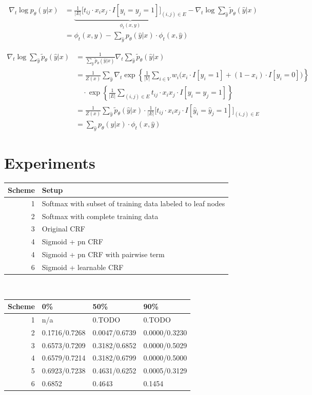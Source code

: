 \documentclass[11pt,a4paper]{article}
\begin{document}
\begin{align*}
\nabla_t\log p_\theta(y|x)&=\underbrace{\frac{1}{|E|}\Big[t_{ij}\cdot x_ix_j\cdot I[y_i=y_j=1]\Big]_{(i,j)\in E}}_{\phi_t(x,y)}-\nabla_t\log\sum_{\hat{y}}\tilde{p}_\theta(\hat{y}|x)\\
&=\phi_t(x,y)-\sum_{\hat{y}}p_\theta(\hat{y}|x)\cdot\phi_t(x,\hat{y})
\end{align*}

\begin{align*}
\nabla_t\log\sum_{\hat{y}}\tilde{p}_\theta(\hat{y}|x)&=\frac{1}{\sum_{\hat{y}}\tilde{p}_\theta(\hat{y}|x)}\nabla_t\sum_{\hat{y}}\tilde{p}_\theta(\hat{y}|x)\\
&=\frac{1}{Z(x)}\sum_{\hat{y}}\nabla_t\exp\left\{\frac{1}{|V|}\sum_{i\in V}w_i\big(x_i\cdot I[y_i=1]+(1-x_i)\cdot I[y_i=0]\big)\right\}\\
&\quad\cdot\exp\left\{\frac{1}{|E|}\sum_{(i,j)\in E}t_{ij}\cdot x_ix_j\cdot I[y_i=y_j=1]\right\}\\
&=\frac{1}{Z(x)}\sum_{\hat{y}}\tilde{p}_\theta(\hat{y}|x)\cdot\frac{1}{|E|}\Big[t_{ij}\cdot x_ix_j\cdot I[\hat{y}_i=\hat{y}_j=1]\Big]_{(i,j)\in E}\\
&=\sum_{\hat{y}}p_\theta(\hat{y}|x)\cdot\phi_t(x,\hat{y})
\end{align*}

\section{Experiments}
\label{sec:exp}

\begin{table}[htbp]
\centering
\begin{tabular}{r|l}
Scheme & Setup\\
\hline
1 & Softmax with subset of training data labeled to leaf nodes\\
2 & Softmax with complete training data\\
3 & Original CRF\\
4 & Sigmoid + pn CRF\\
4 & Sigmoid + pn CRF with pairwise term\\
6 & Sigmoid + learnable CRF
\end{tabular}
\\
\begin{tabular}{r|l|l|l}
Scheme & 0\% & 50\% & 90\%\\
\hline
1 & n/a & 0.TODO & 0.TODO\\
2 & 0.1716/0.7268 & 0.0047/0.6739 & 0.0000/0.3230\\
3 & 0.6573/0.7209 & 0.3182/0.6852 & 0.0000/0.5029\\
4 & 0.6579/0.7214 & 0.3182/0.6799 & 0.0000/0.5000\\
5 & 0.6923/0.7238 & 0.4631/0.6252 & 0.0005/0.3129\\
6 & 0.6852 & 0.4643 & 0.1454
\end{tabular}
\end{table}
\end{document}

